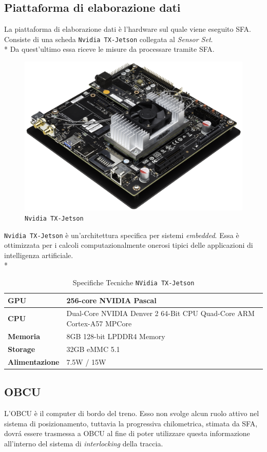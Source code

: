 \subsection{Piattaforma di elaborazione dati}
La piattaforma di elaborazione dati \`e l'hardware sul quale viene eseguito SFA.
Consiste di una scheda \texttt{Nvidia TX-Jetson} collegata al \emph{Sensor Set}.\\*
Da quest'ultimo essa riceve le misure da processare tramite SFA.
\begin{figure}[h]
		\centering
		\includegraphics[width=0.7\linewidth]{img/nvidia}
		\caption{\texttt{Nvidia TX-Jetson}}
		\label{fig:nvidia}
\end{figure}
\texttt{Nvidia TX-Jetson} \`e un'architettura specifica per sistemi \emph{embedded}. Essa \`e ottimizzata per i calcoli computazionalmente onerosi tipici delle applicazioni di intelligenza artificiale. \cite{nvidia}\\*
\begin{table}[h]
\begin{tabular}{|p{3cm}|p{8cm}|}
	\hline 
	\textbf{GPU} & 256-core NVIDIA Pascal\\ 
	\hline 
	\textbf{CPU} & Dual-Core NVIDIA Denver 2 64-Bit CPU Quad-Core ARM Cortex-A57 MPCore \\ 
	\hline 
	\textbf{Memoria} & 8GB 128-bit LPDDR4 Memory \\ 
	\hline 
	\textbf{Storage} & 32GB eMMC 5.1 \\ 
	\hline 
	\textbf{Alimentazione} & 7.5W / 15W \\ 
	\hline 
\end{tabular}
\caption{Specifiche Tecniche \texttt{NVidia TX-Jetson}}
\label{tab:nvidia}
\end{table}
\subsection{OBCU}
L'OBCU \`e il computer di bordo del treno. Esso non svolge alcun ruolo attivo nel sistema di posizionamento, tuttavia la progressiva chilometrica, stimata da SFA, dovr\'a essere trasmessa a OBCU al fine di poter utilizzare questa informazione all'interno del sistema di \emph{interlocking} della traccia.
